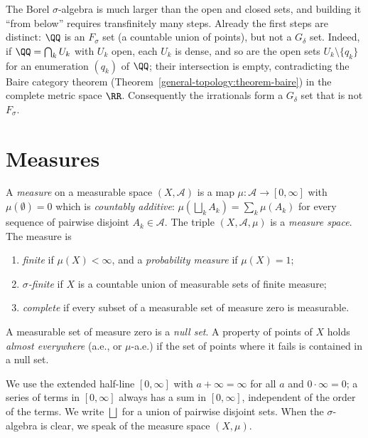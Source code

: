 \begin{remark}\label{measure-theory:remark-borel-hierarchy}
The Borel $\sigma$-algebra is much larger than the open and closed sets, and building it ``from below'' requires transfinitely many steps. Already the first steps are distinct: $\QQ$ is an $F_\sigma$ set
(a countable union of points), but not a $G_\delta$ set. Indeed, if $\QQ = \bigcap_kU_k$ with $U_k$ open, each $U_k$ is dense, and so are the open sets $U_k \setminus \{q_k\}$ for an enumeration
$(q_k)$ of $\QQ$; their intersection is empty, contradicting the Baire category theorem (Theorem~\ref{general-topology:theorem-baire}) in the complete metric space $\RR$. Consequently the irrationals form a
$G_\delta$ set that is not $F_\sigma$.
\end{remark}

\section{Measures}\label{measure-theory:section-measures}

\begin{definition}\label{measure-theory:definition-measure}
A \emph{measure} on a measurable space $(X, \mathcal{A})$ is a map $\mu \colon \mathcal{A} \to [0, \infty]$ with $\mu(\emptyset) = 0$ which is \emph{countably additive}: $\mu(\bigsqcup_kA_k) = \sum_k\mu(A_k)$
for every sequence of pairwise disjoint $A_k \in \mathcal{A}$. The triple $(X, \mathcal{A}, \mu)$ is a \emph{measure space}. The measure is
\begin{enumerate}
\item \emph{finite} if $\mu(X) < \infty$, and a \emph{probability measure} if $\mu(X) = 1$;
\item \emph{$\sigma$-finite} if $X$ is a countable union of measurable sets of finite measure;
\item \emph{complete} if every subset of a measurable set of measure zero is measurable.
\end{enumerate}
A measurable set of measure zero is a \emph{null set}. A property of points of $X$ holds \emph{almost everywhere} (a.e., or $\mu$-a.e.) if the set of points where it fails is contained in a null set.
\end{definition}

\begin{notation}\label{measure-theory:notation-measures}
We use the extended half-line $[0, \infty]$ with $a + \infty = \infty$ for all $a$ and $0 \cdot \infty = 0$; a series of terms in $[0, \infty]$ always has a sum in $[0, \infty]$, independent of the
order of the terms. We write $\bigsqcup$ for a union of pairwise disjoint sets. When the $\sigma$-algebra is clear, we speak of the measure space $(X, \mu)$.
\end{notation}

